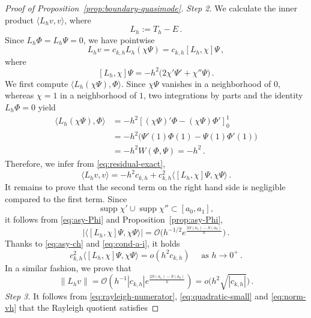 \documentclass[11pt]{amsart}
\numberwithin{equation}{section}
\theoremstyle{remark}
\begin{document}
\begin{proof}[Proof of Proposition~\ref{prop:boundary-quasimode}]
%
\medskip
	\noindent
\emph{Step 2.} We calculate the inner product $\langle L_hv,v\rangle$, where
\[
L_h:=T_h-E\,.
\]
Since \(L_h\Phi=L_h\Psi=0\), we have pointwise
\begin{equation}\label{eq:residual-exact}
	L_hv
	=
	c_{k,h}L_h(\chi\Psi)
	=
	c_{k,h}[L_h,\chi]\Psi\,,
\end{equation}
where
\begin{equation}\label{eq:commutator}
	[L_h,\chi]\Psi
	=
	-h^2\bigl(2\chi'\Psi'+\chi''\Psi\bigr)\,.
\end{equation}
	We first compute \(
	\bigl\langle L_h(\chi\Psi),\Phi\bigr\rangle\).
Since $\chi\Psi$ vanishes in a neighborhood of $0$, whereas
$\chi=1$ in a neighborhood of $1$, two integrations by parts and the
identity $L_h\Phi=0$ yield
\[
\begin{aligned}
	\bigl\langle L_h(\chi\Psi),\Phi\bigr\rangle
	&=
	-h^2
	\left[
	(\chi\Psi)'\Phi-(\chi\Psi)\Phi'
	\right]_{0}^{1}\\
	&=
	-h^2\bigl(\Psi'(1)\Phi(1)-\Psi(1)\Phi'(1)\bigr)\\
	&=
	-h^2W(\Phi,\Psi)=
	-h^2\,.
\end{aligned}
\]
Therefore, we infer from \eqref{eq:residual-exact},
\begin{equation}\label{eq:rayleigh-numerator}
	\langle L_hv,v\rangle
	=
	-h^2c_{k,h}
	+
	c_{k,h}^2
	\bigl\langle [L_h,\chi]\Psi,\chi\Psi\bigr\rangle\,.
\end{equation}
It remains to prove that the second term on the right hand side is negligible compared to the first term. Since
\[
\operatorname{supp}\chi'\cup\operatorname{supp}\chi''
\subset [a_0,a_1],
\]
it follows from \eqref{eq:asy-Phi} and Proposition~\ref{prop:asy-Phi},
\[
	\left|
	\bigl\langle [L_h,\chi]\Psi,\chi\Psi\bigr\rangle
	\right|
	=
	\mathcal O\bigl(h^{-1/2}e^{\frac{3S(a_1)-S(a_0)}{h}}\bigr)\,.
\]
Thanks to \eqref{eq:asy-ch} and \eqref{eq:cond-a-i}, it holds
\begin{equation}\label{eq:quadratic-small}
c_{k,h}^2\langle [L_h,\chi]\Psi,\chi\Psi\bigr\rangle=o(h^2c_{k,h})\quad\mbox{ as } h\to0^+\,.
\end{equation}
%
%
%
In a similar fashion, we prove that
\begin{equation}\label{eq:residual-bound}
	\|L_hv\|=\mathcal O(h^{-1}|c_{k,h}|e^{\frac{2S(a_1)-S(a_0)}{h}})=o\big(h^2\sqrt{|c_{k,h}|}\big)\,.
	\end{equation}
%
%
%
	\medskip
	\noindent
	\emph{Step 3.} It follows from \eqref{eq:rayleigh-numerator}, \eqref{eq:quadratic-small} and  \eqref{eq:norm-vh} that the Rayleigh quotient satisfies

\end{proof}
\end{document}
